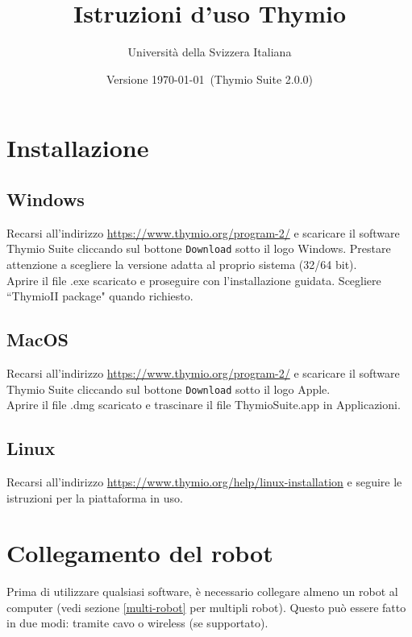 \documentclass[12pt]{article}
\title{Istruzioni d'uso Thymio}
\author{Università della Svizzera Italiana}
\date{Versione \today \ (Thymio Suite 2.0.0)}
\begin{document}
\maketitle
\tableofcontents
\newpage


\section{Installazione}\label{installation}

	\subsection{Windows}
	
		Recarsi all'indirizzo \url{https://www.thymio.org/program-2/} e scaricare il software Thymio Suite cliccando sul bottone \texttt{Download} sotto il logo Windows. Prestare attenzione a scegliere la versione adatta al proprio sistema (32/64 bit).\\
		Aprire il file .exe scaricato e proseguire con l'installazione guidata. Scegliere ``ThymioII package" quando richiesto.
		
	\subsection{MacOS}
	
		Recarsi all'indirizzo \url{https://www.thymio.org/program-2/} e scaricare il software Thymio Suite cliccando sul bottone \texttt{Download} sotto il logo Apple.\\	
		Aprire il file .dmg scaricato e trascinare il file ThymioSuite.app in Applicazioni.
		
	\subsection{Linux}
	
		Recarsi all'indirizzo \url{https://www.thymio.org/help/linux-installation} e seguire le istruzioni per la piattaforma in uso.
			

\section{Collegamento del robot}

	Prima di utilizzare qualsiasi software, è necessario collegare almeno un robot al computer (vedi sezione \ref{multi-robot} per multipli robot). Questo può essere fatto in due modi: tramite cavo o wireless (se supportato).
	
\end{document}
